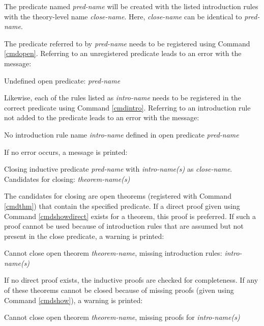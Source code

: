 The predicate named \emph{pred-name} will be created with the listed introduction rules with the theory-level name \emph{close-name}.
%
Here, \emph{close-name} can be identical to \emph{pred-name}.
%

The predicate referred to by \emph{pred-name} needs to be registered using Command \ref{cmdopen}.
%
Referring to an unregistered predicate leads to an error with the message:
%

\begin{err}
Undefined open predicate: \emph{pred-name}
\end{err}

Likewise, each of the rules listed as \emph{intro-name} needs to be registered in the correct predicate using Command \ref{cmdintro}.
%
Referring to an introduction rule not added to the predicate leads to an error with the message:
%

\begin{err}
No introduction rule name \emph{intro-name} defined in open predicate \emph{pred-name}
\end{err}

If no error occurs, a message is printed:
\begin{msg}
Closing inductive predicate \emph{pred-name} with \emph{intro-name(s)} as \emph{close-name}.
Candidates for closing: \emph{theorem-name(s)}
\end{msg}

The candidates for closing are open theorems (registered with Command \ref{cmdthm}) that contain the specified predicate.
%
If a direct proof given using Command \ref{cmdshowdirect} exists for a theorem, this proof is preferred.
%
If such a proof cannot be used because of introduction rules that are assumed but not present in the close predicate, a warning is printed:

\begin{msg} \label{msgassm}
Cannot close open theorem \emph{theorem-name}, missing introduction rules: \emph{intro-name(s)}
\end{msg}

If no direct proof exists, the inductive proofs are checked for completeness.
%
If any of these theorems cannot be closed because of missing proofs (given using Command \ref{cmdshow}), a warning is printed:
%

\begin{msg}
Cannot close open theorem \emph{theorem-name}, missing proofs for \emph{intro-name(s)}
\end{msg}

